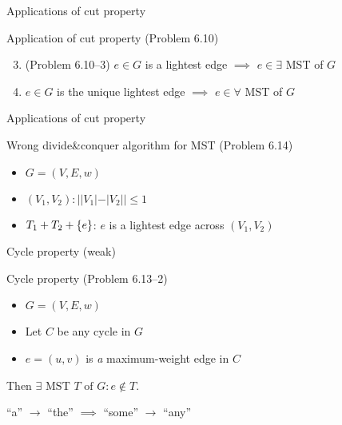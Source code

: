 \begin{frame}{Applications of cut property}
  \begin{exampleblock}{Application of cut property (Problem 6.10)}
	\begin{enumerate}[(1)]
	  \setcounter{enumi}{2}
	  \item (Problem 6.10--3) $e \in G$ is a lightest edge $\implies$ $e \in \exists$ MST of $G$
	  \item $e \in G$ is the unique lightest edge $\implies$ $e \in \forall$ MST of $G$
	\end{enumerate}
  \end{exampleblock}
\end{frame}
\begin{frame}{Applications of cut property}
  \begin{exampleblock}{Wrong divide\&conquer algorithm for MST (Problem 6.14)}
    \begin{itemize}
      \item $G = (V, E, w)$
      \item $(V_{1}, V_{2}): ||V_{1}| - |V_{2}|| \le 1$
      \item $T_{1} + T_{2} + \{e\}$: $e$ is a lightest edge across $(V_{1}, V_{2})$
    \end{itemize}
  \end{exampleblock}

\end{frame}
\begin{frame}{Cycle property (weak)}
  \begin{exampleblock}{Cycle property (Problem 6.13--2)}
	\begin{itemize}
	  \item $G = (V,E,w)$
	  \item Let $C$ be any cycle in $G$
	  \item $e = (u,v)$ is \emph{a} maximum-weight edge in $C$
	\end{itemize}
	Then $\exists \textrm{ MST } T \text{ of } G: e \notin T$.
  \end{exampleblock}

  \begin{center}
	``a'' $\to$ ``the'' $\implies$ ``some'' $\to$ ``any''
  \end{center}
\end{frame}
